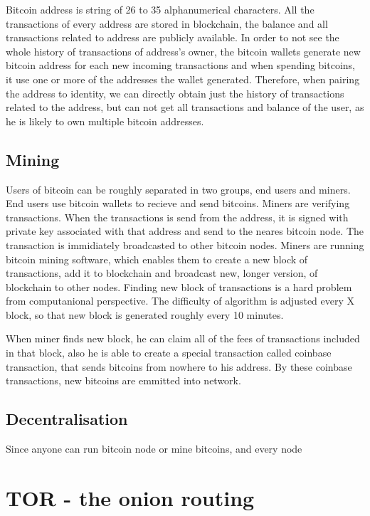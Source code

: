 \documentclass[
  digital, %
  table,   %
  lof,     %
  lot,     %
  oneside
]{fithesis3}
\begin{document}
Bitcoin address is string of 26 to 35 alphanumerical characters.
All the transactions of every address are stored in blockchain, the balance and all transactions related to address are
publicly available.
In order to not see the whole history of transactions of address's owner,
the bitcoin wallets generate new bitcoin address for each new incoming transactions and when spending bitcoins, it use one or more of the addresses the wallet generated.
Therefore, when pairing the address to identity, we can directly obtain just the history of transactions related to the address,
but can not get all transactions and balance of the user, as he is likely to own multiple bitcoin addresses.

\subsection{Mining}
Users of bitcoin can be roughly separated in two groups, end users and miners.
End users use bitcoin wallets to recieve and send bitcoins.
Miners are verifying transactions. When the transactions is send from the address, 
it is signed with private key associated with that address and send to the neares bitcoin node.
The transaction is immidiately broadcasted to other bitcoin nodes.
Miners are running bitcoin mining software, which enables them to create a new block of transactions, add it to blockchain
and broadcast new, longer version, of blockchain to other nodes.
Finding new block of transactions is a hard problem from computanional perspective.
The difficulty of algorithm is adjusted every X block, so that new block is generated roughly every 10 minutes.

When miner finds new block, he can claim all of the fees of transactions included in that block,
also he is able to create a special transaction called coinbase transaction, that sends bitcoins from nowhere to his address.
By these coinbase transactions, new bitcoins are emmitted into network.

\subsection{Decentralisation}

Since anyone can run bitcoin node or mine bitcoins, and every node

\section{TOR - the onion routing}
\end{document}
